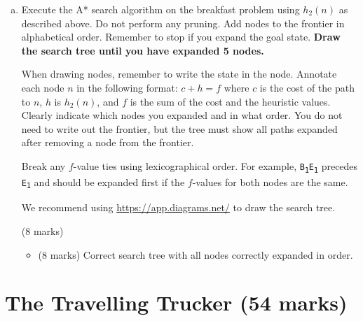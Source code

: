 \documentclass[12pt]{article}
\begin{document}
\begin{enumerate}[(a)]
Does $h_2$ dominate $h_1$? Explain why or why not in \textbf{4 sentences or less}

\begin{markscheme} (4 marks)
\begin{itemize}
\item
(2 marks) Correct answer
\item
(2 marks) A reasonable explanation
\end{itemize}

\end{markscheme}


\item
\label{execute_a_star}
Execute the A* search algorithm on the breakfast problem using $h_2(n)$ as described above. Do not perform any pruning. Add nodes to the frontier in alphabetical order. Remember to stop if you expand the goal state. \textbf{Draw the search tree until you have expanded 5 nodes.}

When drawing nodes, remember to write the state in the node. Annotate each node $n$ in the following format: $c + h = f$ where $c$ is the cost of the path to $n$, $h$ is $h_2(n)$, and $f$ is the sum of the cost and the heuristic values. Clearly indicate which nodes you expanded and in what order. You do not need to write out the frontier, but the tree must show all paths expanded after removing a node from the frontier.

Break any $f$-value ties using lexicographical order. For example, \texttt{B\textsubscript{1}E\textsubscript{1}} precedes \texttt{E\textsubscript{1}} and should be expanded first if the $f$-values for both nodes are the same.

We recommend using \url{https://app.diagrams.net/} to draw the search tree.

\begin{markscheme} (8 marks)
\begin{itemize}
    \item (8 marks) Correct search tree with all nodes correctly expanded in order.
\end{itemize}
\end{markscheme}


\end{enumerate}



\newpage
\section{The Travelling Trucker (54 marks)}
\end{document}
